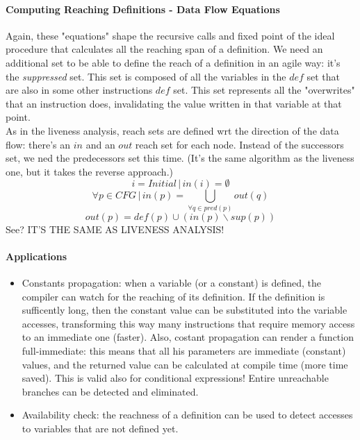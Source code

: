 \documentclass[10pt,a4paper]{article}
\begin{document}
	 			\paragraph{Computing Reaching Definitions - Data Flow Equations}
	 				Again, these "equations" shape the recursive calls and fixed point of the ideal procedure that calculates all the reaching span of a definition. We need an additional set to be able to define the reach of a definition in an agile way: it's the \emph{suppressed} set. This set is composed of all the variables in the $def$ set that are also in some other instructions $def$ set. This set represents all the "overwrites" that an instruction does, invalidating the value written in that variable at that point.\\
	 				As in the liveness analysis, reach sets are defined wrt the direction of the data flow: there's an $in$ and an $out$ reach set for each node. Instead of the successors set, we ned the predecessors set this time. (It's the same algorithm as the liveness one, but it takes the reverse approach.)
	 				\begin{equation}
	 					i = Initial \,\vert\, in(i) = \emptyset
	 				\end{equation}
					\begin{equation}
	 					\forall p \in CFG \,\vert\, in(p) = \bigcup\limits_{\forall q \in pred(p)} out(q)
	 				\end{equation}
					\begin{equation}
	 					out(p) = def(p) \cup (in(p) \backslash sup(p))
	 				\end{equation}
	 				See? IT'S THE SAME AS LIVENESS ANALYSIS!
 				
 				\paragraph{Applications}
 					\begin{itemize}
 						\item Constants propagation: when a variable (or a constant) is defined, the compiler can watch for the reaching of its definition. If the definition is sufficently long, then the constant value can be substituted into the variable accesses, transforming this way many instructions that require memory access to an immediate one (faster). Also, costant propagation can render a function full-immediate: this means that all his parameters are immediate (constant) values, and the returned value can be calculated at compile time (more time saved). This is valid also for conditional expressions! Entire unreachable branches can be detected and eliminated.
 						\item Availability check: the reachness of a definition can be used to detect accesses to variables that are not defined yet. 
 					\end{itemize}
					
			
			
			
			
			
			
			
			
			
			
			
			
			
			
			
			
			
			
			
			
			
			

		
	
\end{document}

